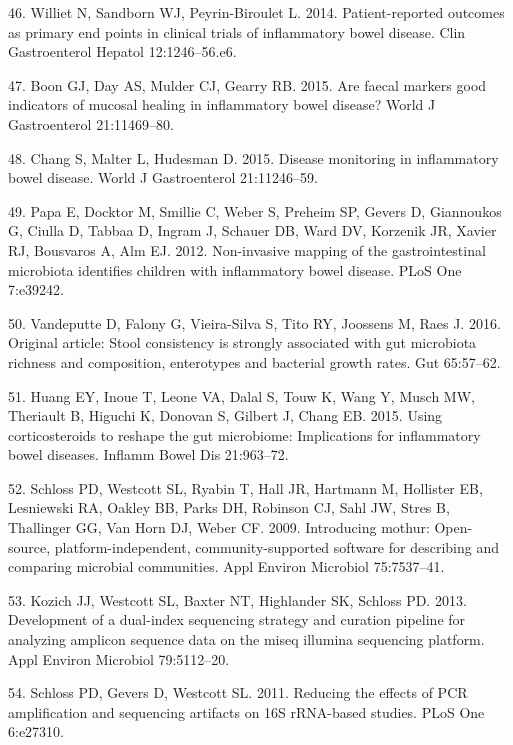 \documentclass[12pt,]{article}
\begin{document}
\hypertarget{ref-Williet2014_PROs}{}
46. Williet N, Sandborn WJ, Peyrin-Biroulet L. 2014. Patient-reported
outcomes as primary end points in clinical trials of inflammatory bowel
disease. Clin Gastroenterol Hepatol 12:1246--56.e6.

\hypertarget{ref-boon_fmarkers_2015}{}
47. Boon GJ, Day AS, Mulder CJ, Gearry RB. 2015. Are faecal markers good
indicators of mucosal healing in inflammatory bowel disease? World J
Gastroenterol 21:11469--80.

\hypertarget{ref-chang_monitoring_2015}{}
48. Chang S, Malter L, Hudesman D. 2015. Disease monitoring in
inflammatory bowel disease. World J Gastroenterol 21:11246--59.

\hypertarget{ref-papa_pedsIBD_2012}{}
49. Papa E, Docktor M, Smillie C, Weber S, Preheim SP, Gevers D,
Giannoukos G, Ciulla D, Tabbaa D, Ingram J, Schauer DB, Ward DV,
Korzenik JR, Xavier RJ, Bousvaros A, Alm EJ. 2012. Non-invasive mapping
of the gastrointestinal microbiota identifies children with inflammatory
bowel disease. PLoS One 7:e39242.

\hypertarget{ref-vandeputte_stoolcon_2016}{}
50. Vandeputte D, Falony G, Vieira-Silva S, Tito RY, Joossens M, Raes J.
2016. Original article: Stool consistency is strongly associated with
gut microbiota richness and composition, enterotypes and bacterial
growth rates. Gut 65:57--62.

\hypertarget{ref-huang_cort_2015}{}
51. Huang EY, Inoue T, Leone VA, Dalal S, Touw K, Wang Y, Musch MW,
Theriault B, Higuchi K, Donovan S, Gilbert J, Chang EB. 2015. Using
corticosteroids to reshape the gut microbiome: Implications for
inflammatory bowel diseases. Inflamm Bowel Dis 21:963--72.

\hypertarget{ref-schloss_mothur_2009}{}
52. Schloss PD, Westcott SL, Ryabin T, Hall JR, Hartmann M, Hollister
EB, Lesniewski RA, Oakley BB, Parks DH, Robinson CJ, Sahl JW, Stres B,
Thallinger GG, Van Horn DJ, Weber CF. 2009. Introducing mothur:
Open-source, platform-independent, community-supported software for
describing and comparing microbial communities. Appl Environ Microbiol
75:7537--41.

\hypertarget{ref-Kozich_MiSeqSOP_2013}{}
53. Kozich JJ, Westcott SL, Baxter NT, Highlander SK, Schloss PD. 2013.
Development of a dual-index sequencing strategy and curation pipeline
for analyzing amplicon sequence data on the miseq illumina sequencing
platform. Appl Environ Microbiol 79:5112--20.

\hypertarget{ref-schloss_PCRartifacts_2011}{}
54. Schloss PD, Gevers D, Westcott SL. 2011. Reducing the effects of PCR
amplification and sequencing artifacts on 16S rRNA-based studies. PLoS
One 6:e27310.
\end{document}
